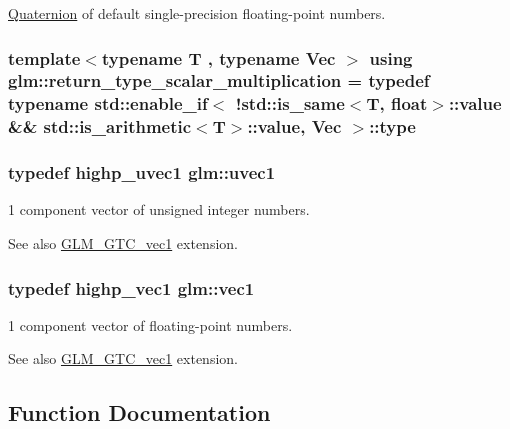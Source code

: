 \hyperlink{class_quaternion}{Quaternion} of default single-\/precision floating-\/point numbers. 

\hypertarget{namespaceglm_a68a5dc6ff1dbac4fda02c3b177afa4aa}{}
\subsubsection[{return\+\_\+type\+\_\+scalar\+\_\+multiplication}]{\setlength{\rightskip}{0pt plus 5cm}template$<$typename T , typename Vec $>$ using {\bf glm\+::return\+\_\+type\+\_\+scalar\+\_\+multiplication} = typedef typename std\+::enable\+\_\+if$<$ !std\+::is\+\_\+same$<$T, float$>$\+::value \&\& std\+::is\+\_\+arithmetic$<$T$>$\+::value, Vec $>$\+::type}\label{namespaceglm_a68a5dc6ff1dbac4fda02c3b177afa4aa}
\hypertarget{namespaceglm_a4e12bc23a3d060164eef452f81d92a03}{}
\subsubsection[{uvec1}]{\setlength{\rightskip}{0pt plus 5cm}typedef {\bf highp\+\_\+uvec1} {\bf glm\+::uvec1}}\label{namespaceglm_a4e12bc23a3d060164eef452f81d92a03}
1 component vector of unsigned integer numbers. \begin{DoxySeeAlso}{See also}
\hyperlink{group__gtc__vec1}{G\+L\+M\+\_\+\+G\+T\+C\+\_\+vec1} extension. 
\end{DoxySeeAlso}
\hypertarget{namespaceglm_a16030dae9029ed1eab1553a2183bbb79}{}
\subsubsection[{vec1}]{\setlength{\rightskip}{0pt plus 5cm}typedef {\bf highp\+\_\+vec1} {\bf glm\+::vec1}}\label{namespaceglm_a16030dae9029ed1eab1553a2183bbb79}
1 component vector of floating-\/point numbers. \begin{DoxySeeAlso}{See also}
\hyperlink{group__gtc__vec1}{G\+L\+M\+\_\+\+G\+T\+C\+\_\+vec1} extension. 
\end{DoxySeeAlso}


\subsection{Function Documentation}
\hypertarget{namespaceglm_a68109cc8f5b3e44fd65707fac87fb4d5}{}

